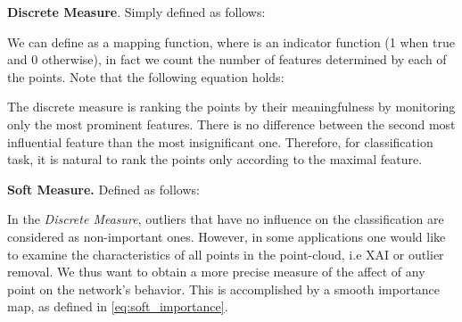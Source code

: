 \documentclass[10pt,twocolumn,letterpaper]{article}
\begin{document}
\textbf{Discrete Measure}. Simply defined as follows:

We can define  as a mapping function, 
where  is an indicator function (1 when true and 0 otherwise), in fact we count the number of features determined by each of the points.
Note that the following equation holds:



The discrete measure is ranking the points by their meaningfulness by monitoring only the most prominent features. There is no difference between the second most influential feature than the most insignificant one. Therefore, for classification task, it is natural to rank the points only according to the maximal feature.

\textbf{Soft Measure.} Defined as follows:


In the \textit{Discrete Measure}, outliers that have no influence on the classification are considered as non-important ones. However, in some applications one would like to examine the characteristics of all points in the point-cloud, i.e XAI or outlier removal. We thus want to obtain a more precise measure of the affect of any point on 
the network's behavior.
This is accomplished by a smooth importance map, as defined in \eqref{eq:soft_importance}.
\end{document}
